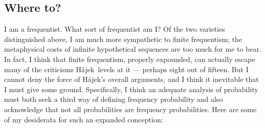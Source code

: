 \documentclass[letterpaper,12pt]{article}
\newcommand{\hajek}{H\'ajek}
\begin{document}
\subsection{Where to?}
I am a frequentist. What sort of frequentist am I? Of the two varieties distinguished above, I am much more sympathetic to finite frequentism; the metaphysical costs of infinite hypothetical sequences are too much for me to bear. In fact, I think that finite frequentism, properly expounded, can actually escape many of the criticisms \hajek\ levels at it --- perhaps eight out of fifteen. But I cannot deny the force of \hajek's overall arguments, and I think it inevitable that I must give some ground. Specifically, I think an adequate analysis of probability must both seek a third way of defining frequency probability and also acknowledge that not all probabilities are frequency probabilities. Here are some of my desiderata for such an expanded conception:
\end{document}
